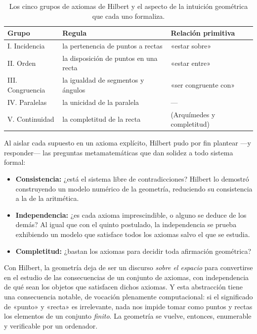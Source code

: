 \begin{table}[h!]
    \centering
    \begin{tabular}{@{}lll@{}}
        \toprule
        \textbf{Grupo}   & \textbf{Regula}                       & \textbf{Relación primitiva} \\
        \midrule
        I. Incidencia    & la pertenencia de puntos a rectas     & «estar sobre»               \\
        II. Orden        & la disposición de puntos en una recta & «estar entre»               \\
        III. Congruencia & la igualdad de segmentos y ángulos    & «ser congruente con»        \\
        IV. Paralelas    & la unicidad de la paralela            & ---                         \\
        V. Continuidad   & la completitud de la recta            & (Arquímedes y completitud)  \\
        \bottomrule
    \end{tabular}
    \caption{Los cinco grupos de axiomas de Hilbert y el aspecto de la intuición geométrica que cada uno formaliza.}
    \label{tab:hilbert-grupos}
\end{table}

Al aislar cada supuesto en un axioma explícito, Hilbert pudo por fin plantear —y responder— las preguntas
metamatemáticas que dan solidez a todo sistema formal:

\begin{itemize}
    \item \textbf{Consistencia:} ¿está el sistema libre de contradicciones? Hilbert lo demostró construyendo un modelo
          numérico de la geometría, reduciendo su consistencia a la de la aritmética.
    \item \textbf{Independencia:} ¿es cada axioma imprescindible, o alguno se deduce de los demás? Al igual que con el
          quinto postulado, la independencia se prueba exhibiendo un modelo que satisface todos los axiomas salvo el que
          se estudia.
    \item \textbf{Completitud:} ¿bastan los axiomas para decidir toda afirmación geométrica?
\end{itemize}

Con Hilbert, la geometría deja de ser un discurso \emph{sobre el espacio} para convertirse en el estudio de las
consecuencias de un conjunto de axiomas, con independencia de qué sean los objetos que satisfacen dichos axiomas. Y
esta abstracción tiene una consecuencia notable, de vocación plenamente computacional: si el significado de «punto» y
«recta» es irrelevante, nada nos impide tomar como puntos y rectas los elementos de un conjunto \emph{finito}. La
geometría se vuelve, entonces, enumerable y verificable por un ordenador.

